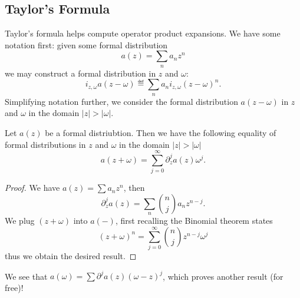 \subsection{Taylor's Formula}

\M
Taylor's formula helps compute operator product expansions. We have some
notation first: given some formal distribution 
\begin{equation}
a(z)=\sum_{n}a_{n}z^{n}
\end{equation}
we may construct a formal distribution in $z$ and $\omega$:
\begin{equation}
i_{z,\omega}a(z-\omega)\eqdef\sum_{n} a_{n}i_{z,\omega}(z-\omega)^{n}.
\end{equation}
Simplifying notation further, we consider the formal distribution
$a(z-\omega)$ in $z$ and $\omega$ in the domain $|z|>|\omega|$.

\begin{prop}
Let $a(z)$ be a formal distriubtion. Then we have the following equality
of formal distributions in $z$ and $\omega$ in the domain $|z|>|\omega|$
\begin{equation}
a(z+\omega)=\sum^{\infty}_{j=0}\partial_{z}^{j}a(z)\omega^{j}.
\end{equation}
\end{prop}
\begin{proof}
We have $a(z)=\sum a_{n}z^{n}$, then
\begin{equation}
\partial_{z}^{j}a(z)=\sum_{n}\binom{n}{j}a_{n}z^{n-j}.
\end{equation}
We plug $(z+\omega)$ into $a(-)$, first recalling the Binomial theorem states
\begin{equation}
(z+\omega)^{n}=\sum^{\infty}_{j=0}\binom{n}{j}z^{n-j}\omega^{j}
\end{equation}
thus we obtain the desired result.
\end{proof}

\begin{rmk}
We see that $a(\omega)=\sum\partial^{j}a(z)(\omega-z)^{j}$, which proves
another result (for free)!
\end{rmk}

